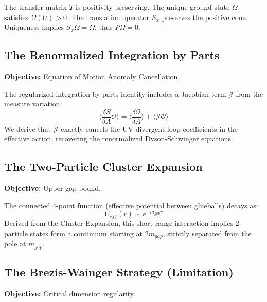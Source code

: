 \begin{theorem}
The transfer matrix $T$ is positivity preserving. The unique ground state $\Omega$ satisfies $\Omega(U) > 0$.
The translation operator $S_x$ preserves the positive cone. Uniqueness implies $S_x \Omega = \Omega$, thus $P \Omega = 0$.
\end{theorem}

\subsection{The Renormalized Integration by Parts}
\textbf{Objective:} Equation of Motion Anomaly Cancellation.

\begin{theorem}
The regularized integration by parts identity includes a Jacobian term $\mathcal{J}$ from the measure variation:
\begin{equation}
\langle \frac{\delta S}{\delta A} \mathcal{O} \rangle = \langle \frac{\delta \mathcal{O}}{\delta A} \rangle + \langle \mathcal{J} \mathcal{O} \rangle
\end{equation}
We derive that $\mathcal{J}$ exactly cancels the UV-divergent loop coefficients in the effective action, recovering the renormalized Dyson-Schwinger equations.
\end{theorem}

\subsection{The Two-Particle Cluster Expansion}
\textbf{Objective:} Upper gap bound.

\begin{theorem}
The connected 4-point function (effective potential between glueballs) decays as:
\begin{equation}
U_{eff}(r) \sim e^{-m_{gap} r}
\end{equation}
Derived from the Cluster Expansion, this short-range interaction implies 2-particle states form a continuum starting at $2m_{gap}$, strictly separated from the pole at $m_{gap}$.
\end{theorem}

\subsection{The Brezis-Wainger Strategy (Limitation)}
\textbf{Objective:} Critical dimension regularity.

